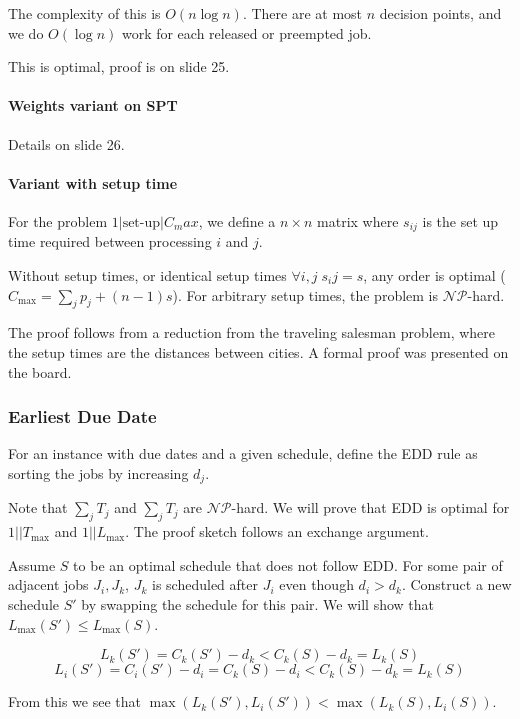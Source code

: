 \documentclass{idc_msc}
\newcommand{\NPclass}{\mathcal{NP}}
\begin{document}
The complexity of this is \(O(n \log n)\).
There are at most \(n\) decision points, and we do \(O(\log n)\) work for each released or preempted job.

This is optimal, proof is on slide 25.

\paragraph{Weights variant on SPT}

Details on slide 26.

\paragraph{Variant with setup time}

For the problem \(1|\text{set-up}|C_max\), we define a \(n \times n\) matrix where \(s_{ij}\) is the set up time required between processing \(i\) and \(j\).

Without setup times, or identical setup times \(\forall i,j\; s_ij = s\), any order is optimal (\(C_{\max} = \sum_j p_j + (n-1)s\)).
For arbitrary setup times, the problem is \(\NPclass\)-hard.

The proof follows from a reduction from the traveling salesman problem, where the setup times are the distances between cities.
A formal proof was presented on the board.

\subsubsection{Earliest Due Date}

For an instance with due dates and a given schedule, define the EDD rule as sorting the jobs by increasing \(d_j\).

Note that \(\sum_j T_j\) and \(\sum_j T_j\) are \(\NPclass\)-hard.
We will prove that EDD is optimal for \(1||T_{\max}\) and \(1||L_{\max}\).
The proof sketch follows an exchange argument.

Assume \(S\) to be an optimal schedule that does not follow EDD.
For some pair of adjacent jobs \(J_i,J_k\), \(J_k\) is scheduled after \(J_i\) even though \(d_i > d_k\).
Construct a new schedule \(S'\) by swapping the schedule for this pair.
We will show that \(L_{\max}(S') \le L_{\max}(S)\).

\[ L_k(S') = C_k(S') - d_k < C_k(S) - d_k = L_k(S) \]
\[ L_i(S') = C_i(S') - d_i = C_k(S) - d_i < C_k(S) - d_k = L_k(S) \]

From this we see that \(\max(L_k(S'), L_i(S')) < \max (L_k(S), L_i(S))\).
\end{document}
